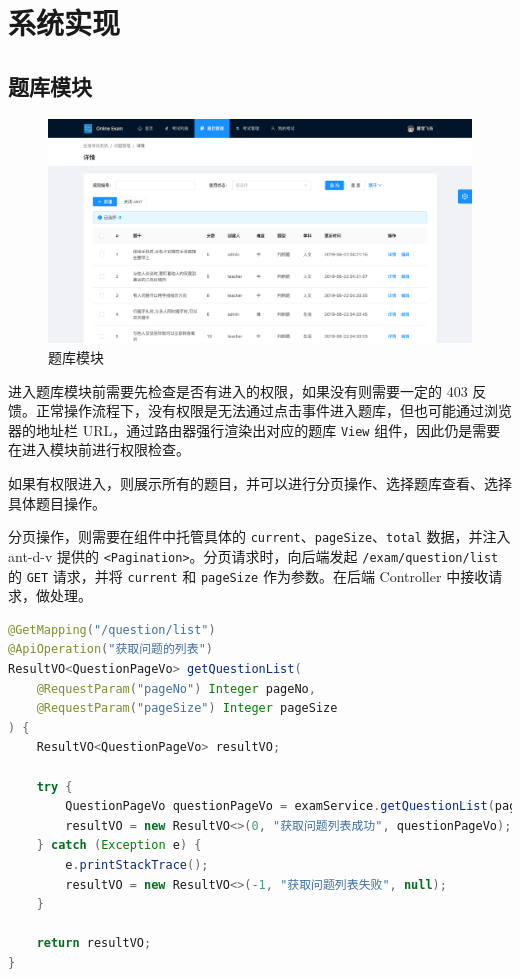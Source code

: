 \section{系统实现}
\subsection{题库模块}
\begin{figure}[hb]
    \centering
    \includegraphics[width=\linewidth]{_images/题库模块截图.png}
    \caption{题库模块}
\end{figure}
进入题库模块前需要先检查是否有进入的权限，如果没有则需要一定的 403 反馈。正常操作流程下，没有权限是无法通过点击事件进入题库，但也可能通过浏览器的地址栏 URL，通过路由器强行渲染出对应的题库 \lstinline!View! 组件，因此仍是需要在进入模块前进行权限检查。

如果有权限进入，则展示所有的题目，并可以进行分页操作、选择题库查看、选择具体题目操作。

分页操作，则需要在组件中托管具体的 \lstinline!current!、\lstinline!pageSize!、\lstinline!total! 数据，并注入 ant-d-v 提供的 \lstinline!<Pagination>!。分页请求时，向后端发起 \lstinline!/exam/question/list! 的 \lstinline!GET! 请求，并将 \lstinline!current! 和 \lstinline!pageSize! 作为参数。在后端 Controller 中接收请求，做处理。

\begin{lstlisting}[language=Java]
@GetMapping("/question/list")
@ApiOperation("获取问题的列表")
ResultVO<QuestionPageVo> getQuestionList(
    @RequestParam("pageNo") Integer pageNo, 
    @RequestParam("pageSize") Integer pageSize
) {
    ResultVO<QuestionPageVo> resultVO;
    
    try {
        QuestionPageVo questionPageVo = examService.getQuestionList(pageNo, pageSize);
        resultVO = new ResultVO<>(0, "获取问题列表成功", questionPageVo);
    } catch (Exception e) {
        e.printStackTrace();
        resultVO = new ResultVO<>(-1, "获取问题列表失败", null);
    }
    
    return resultVO;
}
\end{lstlisting}

